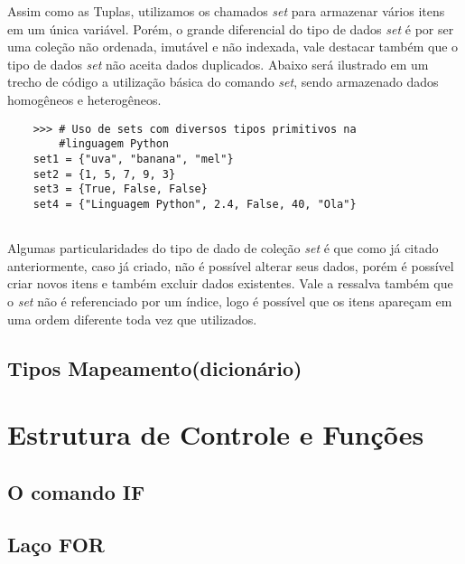 Assim como as Tuplas, utilizamos os chamados \textit{set} para armazenar vários itens em um única variável. Porém, o grande diferencial do tipo de dados \textit{set} é por ser uma coleção não ordenada, imutável e não indexada, vale destacar também que o tipo de dados \textit{set} não aceita dados duplicados. Abaixo será ilustrado em um trecho de código a utilização básica do comando \textit{set}, sendo armazenado dados homogêneos e heterogêneos.
    
  \begin{lstlisting}
  	>>> # Uso de sets com diversos tipos primitivos na
        #linguagem Python
  	set1 = {"uva", "banana", "mel"}
  	set2 = {1, 5, 7, 9, 3}
  	set3 = {True, False, False}
  	set4 = {"Linguagem Python", 2.4, False, 40, "Ola"}
  	
  \end{lstlisting} 

Algumas particularidades do tipo de dado de coleção \textit{set} é que como já citado anteriormente, caso já criado, não é possível alterar seus dados, porém é possível criar novos itens e também excluir dados existentes. Vale a ressalva também que o \textit{set} não é referenciado por um índice, logo é possível que os itens apareçam em uma ordem diferente toda vez que utilizados. 
            \subsection{Tipos Mapeamento(dicionário)}




    \section{Estrutura de Controle e Fun\c{c}\~{o}es}

            \subsection{O comando IF}


            \subsection{La\c{c}o FOR}

